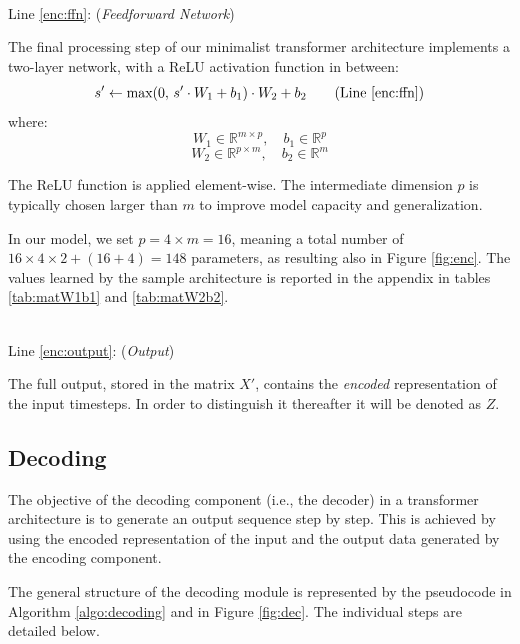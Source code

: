 \documentclass[algorithms,article,submit,pdftex,moreauthors]{Definitions/mdpi}
\begin{document}
~\\Line \ref{enc:ffn}: (\textit{Feedforward Network})

The final processing step of our minimalist transformer architecture implements a two-layer network, with a ReLU activation function in between:
\begin{equation}
    s' \leftarrow \text{max}(0,\,s'\cdot W_1 + b_1) \cdot W_2 + b_2
\tag{Line \ref{enc:ffn}}
\end{equation}
where:
$$
    W_1 \in \mathbb{R}^{m \times p},\quad
    b_1 \in \mathbb{R}^{p}
$$ $$
    W_2 \in \mathbb{R}^{p \times m},\quad
    b_2 \in \mathbb{R}^m
$$

The ReLU function is applied element-wise. The intermediate dimension $p$ is typically chosen larger than $m$ to improve model capacity and generalization. 

In our model, we set $p = 4 \times m = 16$, meaning a total number of $16 \times 4 \times 2 + (16 + 4) = 148$ parameters, as resulting also in Figure \ref{fig:enc}.
The values learned by the sample architecture is reported in the appendix in tables \ref{tab:matW1b1} and \ref{tab:matW2b2}.

~\\Line \ref{enc:output}: (\textit{Output})

The full output, stored in the matrix $X'$, contains the \textit{encoded} representation of the input timesteps. In order to distinguish it thereafter it will be denoted as $Z$. 

\subsection{Decoding} \label{subsec:decoding}

The objective of the decoding component (i.e., the decoder) in a transformer architecture is to generate an output sequence step by step. This is achieved by using the encoded representation of the input and the output data generated by the encoding component.

The general structure of the decoding module is represented by the pseudocode in Algorithm \ref{algo:decoding} and in Figure \ref{fig:dec}. The individual steps are detailed below.
\end{document}
